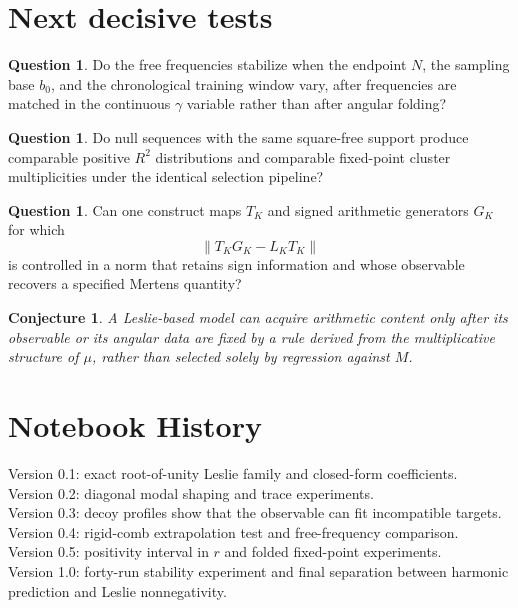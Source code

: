\documentclass[11pt]{amsart}
\numberwithin{equation}{section}
\theoremstyle{plain}
\newtheorem{conjecture}[theorem]{Conjecture}
\theoremstyle{definition}
\newtheorem{question}[theorem]{Question}
\theoremstyle{remark}
\begin{document}
\section{Next decisive tests}
\label{sec:next_tests}

\begin{question}
\label{ques:frequency_stability}
Do the free frequencies stabilize when the endpoint $N$, the sampling base $b_0$, and the chronological training window vary, after frequencies are matched in the continuous $\gamma$ variable rather than after angular folding?
\end{question}

\begin{question}
\label{ques:null_persistence}
Do null sequences with the same square-free support produce comparable positive $R^2$ distributions and comparable fixed-point cluster multiplicities under the identical selection pipeline?
\end{question}

\begin{question}
\label{ques:intertwining}
Can one construct maps $T_K$ and signed arithmetic generators $G_K$ for which
\begin{equation}
\left\|T_KG_K-L_KT_K\right\|
\label{eq:intertwining_error}
\end{equation}
is controlled in a norm that retains sign information and whose observable recovers a specified Mertens quantity?
\end{question}

\begin{conjecture}
\label{conj:minimal_coupling}
A Leslie-based model can acquire arithmetic content only after its observable or its angular data are fixed by a rule derived from the multiplicative structure of $\mu$, rather than selected solely by regression against $M$.
\end{conjecture}

\section*{Notebook History}
Version 0.1: exact root-of-unity Leslie family and closed-form coefficients.\\
Version 0.2: diagonal modal shaping and trace experiments.\\
Version 0.3: decoy profiles show that the observable can fit incompatible targets.\\
Version 0.4: rigid-comb extrapolation test and free-frequency comparison.\\
Version 0.5: positivity interval in $r$ and folded fixed-point experiments.\\
Version 1.0: forty-run stability experiment and final separation between harmonic prediction and Leslie nonnegativity.
\end{document}
